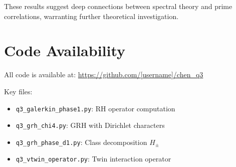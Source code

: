 \documentclass[11pt,a4paper]{article}
\theoremstyle{definition}
\begin{document}
These results suggest deep connections between spectral theory and prime correlations, warranting further theoretical investigation.

\appendix
\section{Code Availability}

All code is available at: \url{https://github.com/[username]/chen_q3}

Key files:
\begin{itemize}
    \item \texttt{q3\_galerkin\_phase1.py}: RH operator computation
    \item \texttt{q3\_grh\_chi4.py}: GRH with Dirichlet characters
    \item \texttt{q3\_grh\_phase\_d1.py}: Class decomposition $H_\pm$
    \item \texttt{q3\_vtwin\_operator.py}: Twin interaction operator
\end{itemize}
\end{document}
